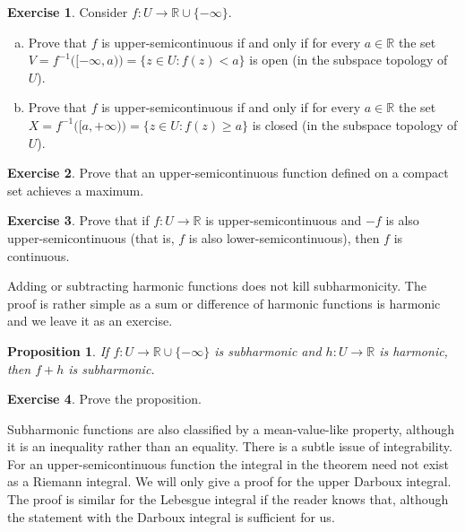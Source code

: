 \documentclass[12pt,openany]{book}
\newcommand{\R}{{\mathbb{R}}}
\theoremstyle{plain}
\newtheorem{prop}[thm]{Proposition}
\theoremstyle{remark}
\theoremstyle{definition}
\newenvironment{exbox}{%
    \def\FrameCommand{\vrule width 1pt \relax\hspace{10pt}}%
    \MakeFramed{\advance\hsize-\width\FrameRestore}%
}{%
    \endMakeFramed
}
\newenvironment{exparts}{%
    \leavevmode\begin{enumerate}[a),noitemsep,topsep=0pt,parsep=0pt,partopsep=0pt]
}{%
    \end{enumerate}
}
\theoremstyle{exercise}
\newtheorem{exercise}{Exercise}[section]
\theoremstyle{example}
\begin{document}
\begin{exbox}
\begin{exercise}%
\label{exercise:uppersemicontclosedopen}
Consider $f \colon U \to \R \cup \{-\infty\}$.
\begin{exparts}
\item
Prove that $f$ is upper-semicontinuous if and only if
for every $a \in \R$
the set
$V = f^{-1}\bigl([-\infty,a)\bigr) = \bigl\{ z \in U : f(z) < a \bigr\}$
is open (in the subspace topology of $U$).
\item
Prove that $f$ is upper-semicontinuous if and only if
for every $a \in \R$
the set
$X = f^{-1}\bigl([a,+\infty)\bigr) = \bigl\{ z \in U : f(z) \geq a \bigr\}$
is closed (in the subspace topology of $U$).
\end{exparts}
\end{exercise}

\begin{exercise}%
\label{exercise:uppersemicontmax}
Prove that an upper-semicontinuous function defined on a compact set achieves a maximum.
\end{exercise}

\begin{exercise}
Prove that if $f \colon U \to \R$ is upper-semicontinuous and $-f$ is also
upper-semicontinuous (that is, $f$ is also lower-semicontinuous), then $f$
is continuous.
\end{exercise}
\end{exbox}

Adding or subtracting 
harmonic functions does not kill subharmonicity.  The proof is rather simple
as a sum or difference of harmonic functions is harmonic and we leave it as
an exercise.

\begin{prop} \label{prop:fplushsubharmonic}
If $f \colon U \to \R \cup \{ - \infty \}$ is subharmonic and $h \colon U
\to \R$ is harmonic, then $f+h$ is subharmonic.
\end{prop}

\begin{exbox}
\begin{exercise}
Prove the proposition.
\end{exercise}
\end{exbox}

Subharmonic functions are also classified by a mean-value-like property,
although it is an inequality rather than an equality.  There is a subtle
issue of integrability.  For an upper-semicontinuous function
the integral in the theorem need not exist as a Riemann integral.
We will only give a proof for the upper Darboux integral.
The proof is 
similar for the Lebesgue integral if the reader knows that, although
the statement with the Darboux integral is sufficient for us.
\end{document}
